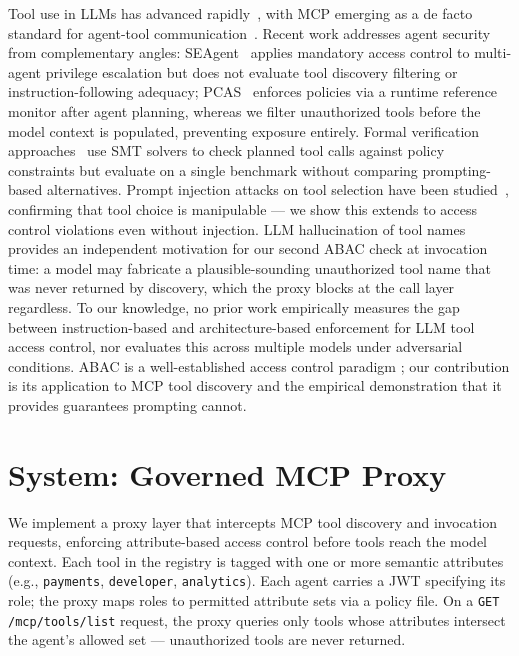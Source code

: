 \documentclass[11pt]{article}
\begin{document}
Tool use in LLMs has advanced rapidly~\cite{schick2023toolformer,
qin2023toolllm}, with MCP emerging as a de facto standard
for agent-tool communication~\cite{anthropic2024mcp}.
Recent work addresses agent security from complementary
angles: SEAgent~\cite{seagent2026} applies mandatory access
control to multi-agent privilege escalation but does not
evaluate tool discovery filtering or instruction-following
adequacy; PCAS~\cite{pcas2026} enforces policies via a
runtime reference monitor after agent planning, whereas
we filter unauthorized tools before the model context is
populated, preventing exposure entirely. Formal verification
approaches~\cite{solveraided2026} use SMT solvers to check
planned tool calls against policy constraints but evaluate
on a single benchmark without comparing prompting-based
alternatives. Prompt injection attacks on tool selection
have been studied~\cite{toolhijacker2025}, confirming
that tool choice is manipulable --- we show this extends
to access control violations even without injection.
LLM hallucination of tool names~\cite{greshake2023indirect}
provides an independent motivation for our second ABAC
check at invocation time: a model may fabricate a
plausible-sounding unauthorized tool name that was never
returned by discovery, which the proxy blocks at the call
layer regardless.
To our knowledge, no prior work empirically measures the
gap between instruction-based and architecture-based
enforcement for LLM tool access control, nor evaluates
this across multiple models under adversarial conditions.
ABAC is a well-established access control paradigm
\cite{hu2013guide}; our contribution is its application
to MCP tool discovery and the empirical demonstration
that it provides guarantees prompting cannot.


\section{System: Governed MCP Proxy}



We implement a proxy layer that intercepts MCP tool
discovery and invocation requests, enforcing attribute-based
access control before tools reach the model context.
Each tool in the registry is tagged with one or more
semantic attributes (e.g., \texttt{payments},
\texttt{developer}, \texttt{analytics}). Each agent
carries a JWT specifying its role; the proxy maps roles
to permitted attribute sets via a policy file. On a
\texttt{GET /mcp/tools/list} request, the proxy queries
only tools whose attributes intersect the agent's allowed
set --- unauthorized tools are never returned.
\end{document}
